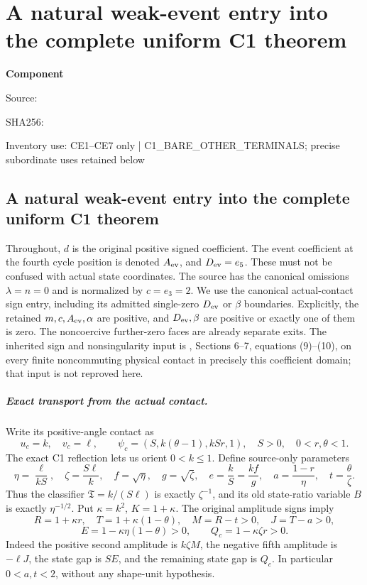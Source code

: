 \chapter{A natural weak-event entry into the complete uniform C1 theorem}
\label{component:pa133fae35e52}
\noindent\textbf{Component }\par
{\small\noindent Source: \par}
{\small\noindent SHA256: \par}
{\small\noindent Inventory use: CE1--CE7 only | C1\_\allowbreak{}BARE\_\allowbreak{}OTHER\_\allowbreak{}TERMINALS; precise subordinate uses retained below\par}
\medskip
\section{A natural weak-event entry into the complete uniform C1 theorem}

Throughout, $d$ is the original positive signed coefficient. The event
coefficient at the fourth cycle position is denoted $A_{\rm ev}$, and
$D_{\rm ev}=e_5$. These must not be confused with actual state coordinates.
The source has the canonical omissions $\lambda=n=0$ and is normalized
by $c=e_3=2$. We use the canonical actual-contact sign entry, including
its admitted single-zero $D_{\rm ev}$ or $\beta$ boundaries. Explicitly,
the retained $m,c,A_{\rm ev},\alpha$ are positive, and $D_{\rm ev},\beta$
are positive or exactly one of them is zero. The noncoercive further-zero
faces are already separate exits. The inherited sign and nonsingularity
input is , Sections 6--7, equations
(9)--(10), on every finite noncommuting physical contact in precisely this
coefficient domain; that input is not reproved here.

\paragraph{Exact transport from the actual contact.}
Write its positive-angle contact as
\[
 u_c=k,\quad v_c=\ell,\qquad
 \psi_c=(S,k(\theta-1),kSr,1),\quad
 S>0,\quad 0<r,\theta<1.
\]
The exact C1 reflection lets us orient $0<k\le1$. Define source-only
parameters
\[
 \eta=\frac{\ell}{kS},\quad \zeta=\frac{S\ell}{k},\quad
 f=\sqrt\eta,\quad g=\sqrt\zeta,\quad
 e=\frac{k}{S}=\frac{kf}{g},\quad
 a=\frac{1-r}{\eta},\quad t=\frac\theta\zeta.
                                                               \tag{CE1}
\]
Thus the classifier $\mathfrak T=k/(S\ell)$ is exactly $\zeta^{-1}$,
and its old state-ratio variable $B$ is exactly $\eta^{-1/2}$.
Put $\kappa=k^2$, $K=1+\kappa$. The original amplitude signs imply
\[
 R=1+\kappa r,\quad T=1+\kappa(1-\theta),\quad
 M=R-t>0,\quad J=T-a>0,
\]
\[
 E=1-\kappa\eta(1-\theta)>0,\qquad
 Q_c=1-\kappa\zeta r>0.                              \tag{CE2}
\]
Indeed the positive second amplitude is $k\zeta M$, the negative
fifth amplitude is $-\ell J$, the state gap is $SE$, and the remaining
state gap is $Q_c$. In particular $0<a,t<2$, without any shape-unit
hypothesis.

